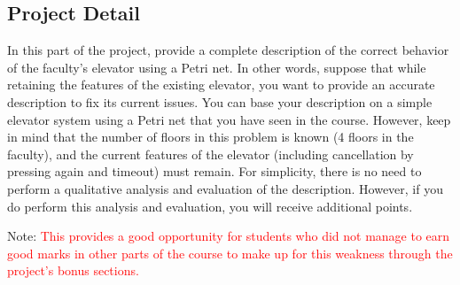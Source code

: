 \documentclass[12pt	]{article}
\begin{document}
\subsection{Project Detail}
In this part of the project, provide a complete description of the correct behavior of the faculty's elevator using a Petri net. In other words, suppose that while retaining the features of the existing elevator, you want to provide an accurate description to fix its current issues. You can base your description on a simple elevator system using a Petri net that you have seen in the course. However, keep in mind that the number of floors in this problem is known (4 floors in the faculty), and the current features of the elevator (including cancellation by pressing again and timeout) must remain. For simplicity, there is no need to perform a qualitative analysis and evaluation of the description. However, if you do perform this analysis and evaluation, you will receive additional points.

Note: \textcolor{red}{This provides a good opportunity for students who did not manage to earn good marks in other parts of the course to make up for this weakness through the project's bonus sections.}









\cite{aljazzar2009safety}\cite{yang1997failure}\cite{nguyen2014mixed}\cite{mon2004intelligent}
\cite{yulong2013intelligent}\cite{aliy2024modeling}\cite{STAirbagSystem}\cite{STM32SmartVest}
\cite{FreescaleAirbagSolution}\cite{EmbeddedSystemAutomobiles}

\newpage


\end{document}
